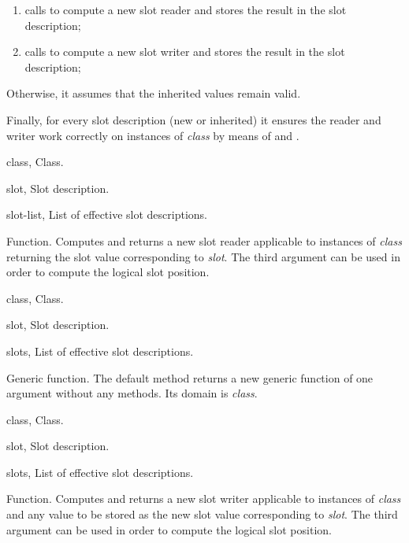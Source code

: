 \begin{optDefinition}
\begin{enumerate}
    \item calls  to compute a new slot reader and
    stores the result in the slot description;

    \item calls  to compute a new slot writer and
    stores the result in the slot description;
\end{enumerate}
%
Otherwise, it assumes that the inherited values remain valid.

Finally, for every slot description (new or inherited) it ensures the reader and
writer work correctly on instances of {\em class} by means of
 and .

%
\begin{genericargs}
    \item[class, \classref{class}] Class.
    \item[slot, \classref{slot}] Slot description.
    \item[slot-list, \classref{list}] List of effective slot descriptions.
\end{genericargs}
%
\result%
Function.
%
\remarks%
Computes and returns a new slot reader applicable to instances of {\em class}
returning the slot value corresponding to {\em slot}. The third
argument can be used in order to compute the logical slot position.

%
\begin{specargs}
    \item[class, \classref{class}] Class.
    \item[slot, \classref{slot}] Slot description.
    \item[slots, \classref{list}] List of effective slot
    descriptions.
\end{specargs}
%
\result%
Generic function.
%
\remarks%
The default method returns a new generic function of one argument
without any methods. Its domain is {\em class}.

%
\begin{genericargs}
    \item[class, \classref{class}] Class.
    \item[slot, \classref{slot}] Slot description.
    \item[slots, \classref{list}] List of effective slot
    descriptions.
\end{genericargs}
%
\result%
Function.
%
\remarks%
Computes and returns a new slot writer applicable to instances of {\em
class} and any value to be stored as the new slot value corresponding
to {\em slot}. The third argument can be used in order to
compute the logical slot position.


\end{optDefinition}
